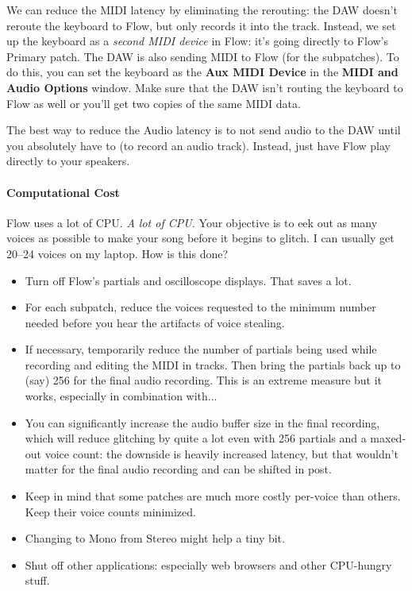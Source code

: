\documentclass{article}
\begin{document}
We can reduce the MIDI latency by eliminating the rerouting: the DAW doesn't reroute the keyboard to Flow, but only records it into the track.  Instead, we set up the keyboard as a {\it second MIDI device} in Flow: it's going directly to Flow's Primary patch.  The DAW is also sending MIDI to Flow (for the subpatches).  To do this, you can set the keyboard as the {\bf Aux MIDI Device} in the {\bf MIDI and Audio Options} window.  Make sure that the DAW isn't routing the keyboard to Flow as well or you'll get two copies of the same MIDI data.

The best way to reduce the Audio latency is to not send audio to the DAW until you absolutely have to (to record an audio track).  Instead, just have Flow play directly to your speakers.

\paragraph{Computational Cost} Flow uses a lot of CPU.   {\it A lot of CPU.}   Your objective is to eek out as many voices as possible to make your song before it begins to glitch.  I can usually get 20--24 voices on my laptop.  How is this done?

\begin{itemize}
\item Turn off Flow's partials and oscilloscope displays.  That saves a lot.
\item For each subpatch, reduce the voices requested to the minimum number needed before you hear the artifacts of voice stealing. 
\item If necessary, temporarily reduce the number of partials being used while recording and editing the MIDI in tracks.  Then bring the partials back up to (say) 256 for the final audio recording.  This is an extreme measure but it works, especially in combination with...
\item You can significantly increase the audio buffer size in the final recording, which will reduce glitching by quite a lot even with 256 partials and a maxed-out voice count: the downside is heavily increased latency, but that wouldn't matter for the final audio recording and can be shifted in post.
\item Keep in mind that some patches are much more costly per-voice than others.  Keep their voice counts minimized.
\item Changing to Mono from Stereo might help a tiny bit.
\item Shut off other applications: especially web browsers and other CPU-hungry stuff.
\end{itemize}
\end{document}
